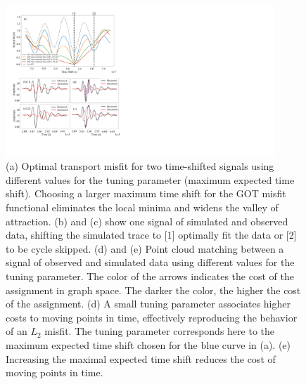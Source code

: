 \documentclass[12pt]{iopart}
\begin{document}
\begin{figure}[!h]
  \centering
  \includegraphics[width=0.9\textwidth]{figure1.pdf}
  \caption{(a) Optimal transport misfit for two time-shifted signals using different values for the tuning parameter (maximum expected time shift). Choosing a larger maximum time shift for the GOT misfit functional eliminates the local minima and widens the valley of attraction. (b) and (c) show one signal of simulated and observed data, shifting the simulated trace to [1] optimally fit the data or [2] to be cycle skipped. (d) and (e) Point cloud matching between a signal of observed and simulated data using different values for the tuning parameter. The color of the arrows indicates the cost of the assignment in graph space. The darker the color, the higher the cost of the assignment. (d) A small tuning parameter associates higher costs to moving points in time, effectively reproducing the behavior of an $L_2$ misfit. The tuning parameter corresponds here to the maximum expected time shift chosen for the blue curve in (a). (e) Increasing the maximal expected time shift reduces the cost of moving points in time.}
  \label{fig:MisfitevolutionGOT}
\end{figure}
\end{document}
